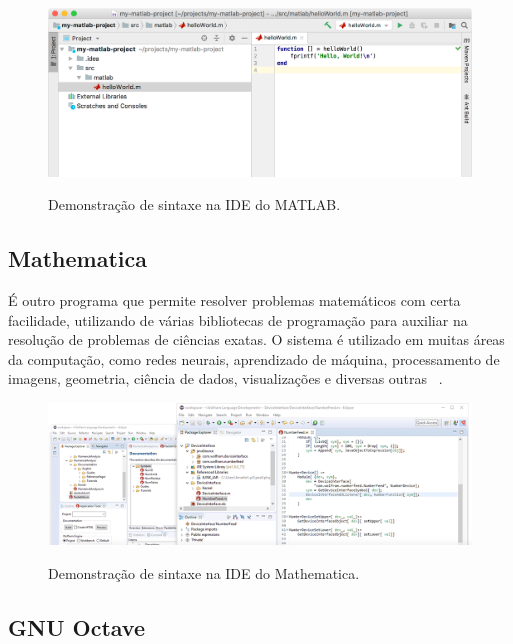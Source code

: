 \begin{figure}[H]
    \caption{\small Demonstração de sintaxe na IDE do MATLAB.}
	\centering
	\includegraphics[width=\textwidth]{figs/matlab-syntax.png}
	\label{f.matlab-syntax}
\end{figure}

\subsection{Mathematica}
\label{ss.mathematica}

É outro programa que permite resolver problemas matemáticos com certa facilidade, utilizando de várias bibliotecas de programação para auxiliar na resolução de problemas de ciências exatas.
O sistema é utilizado em muitas áreas da computação, como redes neurais, aprendizado de máquina, processamento de imagens, geometria, ciência de dados, visualizações e diversas outras ~\cite{mathematica}.

\begin{figure}[H]
    \caption{\small Demonstração de sintaxe na IDE do Mathematica.}
	\centering
	\includegraphics[width=\textwidth]{figs/mathematica-ide.png}
	\label{f.matlab-syntax}
\end{figure}

\subsection{GNU Octave}
\label{ss.gnu}

